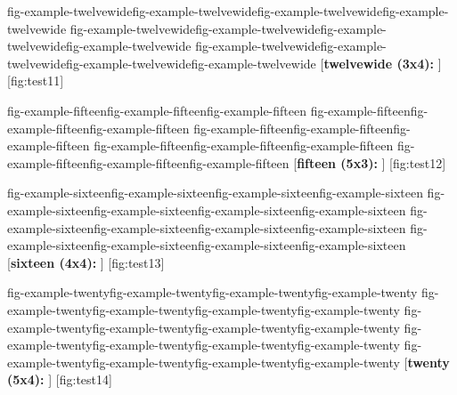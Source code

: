 \figfloat
    {
        \figtwelvewide
        {{fig-example-twelvewide}{fig-example-twelvewide}{fig-example-twelvewide}{fig-example-twelvewide}}
        {{fig-example-twelvewide}{fig-example-twelvewide}{fig-example-twelvewide}{fig-example-twelvewide}}
        {{fig-example-twelvewide}{fig-example-twelvewide}{fig-example-twelvewide}{fig-example-twelvewide}}
    }
    [\textbf{twelvewide (3x4):} \lipsum[1][1-5]]
    [fig:test11]

\figfloat
    {
        \figfifteen
        {{fig-example-fifteen}{fig-example-fifteen}{fig-example-fifteen}}
        {{fig-example-fifteen}{fig-example-fifteen}{fig-example-fifteen}}
        {{fig-example-fifteen}{fig-example-fifteen}{fig-example-fifteen}}
        {{fig-example-fifteen}{fig-example-fifteen}{fig-example-fifteen}}
        {{fig-example-fifteen}{fig-example-fifteen}{fig-example-fifteen}}
    }
    [\textbf{fifteen (5x3):} \lipsum[1][1-5]]
    [fig:test12]

\figfloat
    {
        \figsixteen
        {{fig-example-sixteen}{fig-example-sixteen}{fig-example-sixteen}{fig-example-sixteen}}
        {{fig-example-sixteen}{fig-example-sixteen}{fig-example-sixteen}{fig-example-sixteen}}
        {{fig-example-sixteen}{fig-example-sixteen}{fig-example-sixteen}{fig-example-sixteen}}
        {{fig-example-sixteen}{fig-example-sixteen}{fig-example-sixteen}{fig-example-sixteen}}
    }
    [\textbf{sixteen (4x4):} \lipsum[1][1-5]]
    [fig:test13]

\figfloat
    {
        \figtwenty
        {{fig-example-twenty}{fig-example-twenty}{fig-example-twenty}{fig-example-twenty}}
        {{fig-example-twenty}{fig-example-twenty}{fig-example-twenty}{fig-example-twenty}}
        {{fig-example-twenty}{fig-example-twenty}{fig-example-twenty}{fig-example-twenty}}
        {{fig-example-twenty}{fig-example-twenty}{fig-example-twenty}{fig-example-twenty}}
        {{fig-example-twenty}{fig-example-twenty}{fig-example-twenty}{fig-example-twenty}}
    }
    [\textbf{twenty (5x4):} \lipsum[1][1-5]]
    [fig:test14]
